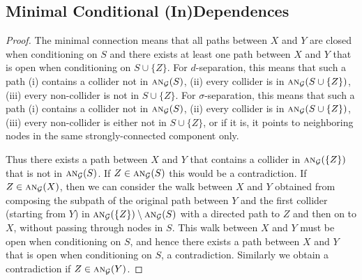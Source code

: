 \documentclass[twoside,11pt]{article}
\newenvironment{customlem}[1]
  {\renewcommand\theinnercustomlem{#1}\innercustomlem}
  {\endinnercustomlem}
\newcommand\C[1]{\mathcal{#1}}
\newcommand\mathbfsc[1]{\text{\normalfont\scshape#1}}
\newcommand\an[1]{\mathbfsc{an}(#1)}
\newcommand\ansub[2]{\mathbfsc{an}_{#1}(#2)}
\begin{document}
\subsection{Minimal Conditional (In)Dependences}

\begin{customlem}{\ref{lemm:min_con}}
\cmdLemmaMinCon
\end{customlem}
\begin{proof}
The minimal connection means that all paths between $X$ and
$Y$ are closed when conditioning on $S$ and there exists at least one
path between $X$ and $Y$ that is open when conditioning on $S \cup \{Z\}$.
For $d$-separation, this means that such a path (i) contains a collider not in $\ansub{\C{G}}{S}$, 
  (ii) every collider is in $\ansub{\C{G}}{S \cup \{Z\}}$,
(iii) every non-collider is not in $S \cup \{Z\}$. 
For $\sigma$-separation, this means that such a path 
  (i) contains a collider not in $\ansub{\C{G}}{S}$, (ii) every collider is in 
  $\ansub{\C{G}}{S \cup \{Z\}}$,
(iii) every non-collider is either not in $S \cup \{Z\}$, or if it is,
it points to neighboring nodes in the same strongly-connected component only.

Thus there exists a path between $X$ and $Y$ that contains a collider in $\ansub{\C{G}}{\{Z\}}$ that 
is not in $\ansub{\C{G}}{S}$. If $Z \in \ansub{\C{G}}{S}$ this would be a contradiction.
If $Z \in \ansub{\C{G}}{X}$, then we can consider the walk between $X$ and $Y$ obtained
from composing the subpath of the original path between $Y$ and the first
collider (starting from $Y$) in $\ansub{\C{G}}{\{Z\}} \setminus \ansub{\C{G}}{S}$ with a directed 
path to $Z$ and then on to $X$, without passing through nodes in $S$.
This walk between $X$ and $Y$ must be open when conditioning on $S$, and hence there exists a path
between $X$ and $Y$ that is open when conditioning on $S$, a contradiction.
Similarly we obtain a contradiction if $Z \in \ansub{\C{G}}{Y}$.
\end{proof}
\end{document}
